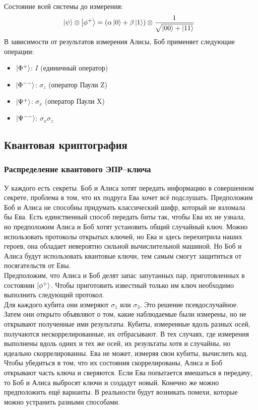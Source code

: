 \documentclass[12pt,a4paper]{article}
\begin{document}
	Состояние всей системы до измерения:\\
	\begin{equation}
		\ket{\psi} \otimes\ket{\phi^{+}}=(\alpha\ket{0} + \beta \ket{1})\otimes \frac{1}{\sqrt{\ket{00} +\ket{11}}}
	\end{equation}
	В зависимости от результатов измерения Алисы, Боб применяет следующие операции:
	\begin{itemize}
		\item $\ket{\Phi^{+}}$: $I$ (единичный оператор)
		\item $\ket{\Phi^{--}}$: $\sigma_{z}$ (оператор Паули Z)
		\item $\ket{\Psi^{+}}$: $\sigma_{x}$ (оператор Паули X)
		\item $\ket{\Psi^{--}}$: $\sigma_{x} \sigma_{z}$
	\end{itemize}
	\subsection{Квантовая криптография}
	\subsubsection{Распределение квантового ЭПР--ключа}
	У каждого есть секреты. Боб и Алиса хотят передать информацию в совершенном секрете, проблема в том, что их подруга Ева хочет всё подслушать. Предположим Боб и Алиса не способны придумать классический шифр, который не взломала бы Ева. Есть единственный способ передать биты так, чтобы Ева их не узнала, но предположим Алиса и Боб хотят установить общий случайный ключ. Можно использовать протоколы открытых ключей, но Ева и здесь перехитрила наших героев, она обладает невероятно сильной вычислительной машиной. Но Боб и Алиса будут использовать квантовые ключи, тем самым смогут защититься от посягательств от Евы. \\
	\indent Предположим, что Алиса и Боб делят запас запутанных пар, приготовленных в состоянии $\ket{\phi^{+}}$. Чтобы приготовить известный только им ключ необходимо выполнить следующий протокол.\\
	\indent Для каждого кубита они измеряют $\sigma_{1}$ или $\sigma_{3}$. Это решение псевдослучайное. Затем они открыто объявляют о том, какие наблюдаемые были измерены, но не открывают полученные ими результаты. Кубиты, измеренные вдоль разных осей, получаются нескоррелированные, их отбрасывают. В тех случаях, где измерения выполнены вдоль одних и тех же осей, их результаты хотя и случайны, но идеально скоррелированны. Ева не может, измеряя свои кубиты, вычислить код. Чтобы убедиться в том, что их состояния скоррелированы, Алиса и Боб открывают часть ключа и сверяются. Если Ева попытается вмешаться в передачу, то Боб и Алиса выбросят ключи и создадут новый. Конечно же можно предположить ещё варианты. В реальности будут возникать помехи, которые можно устранить разными способами.
\end{document}
